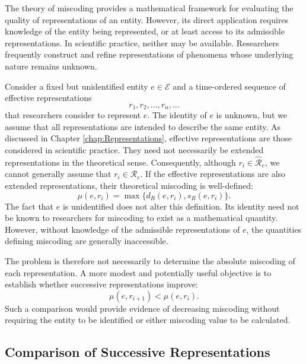 The theory of miscoding provides a mathematical framework for evaluating the quality of representations of an entity. However, its direct application requires knowledge of the entity being represented, or at least access to its admissible representations. In scientific practice, neither may be available. Researchers frequently construct and refine representations of phenomena whose underlying nature remains unknown.

Consider a fixed but unidentified entity $e\in\mathcal E$ and a time-ordered sequence of effective representations
\[
r_1,r_2,\ldots,r_n,\ldots
\]
that researchers consider to represent $e$. The identity of $e$ is unknown, but we assume that all representations are intended to describe the same entity. As discussed in Chapter \ref{chap:Representations}, effective representations are those considered in scientific practice. They need not necessarily be extended representations in the theoretical sense. Consequently, although $r_i\in\hat{\mathcal R}_e$, we cannot generally assume that $r_i\in\mathcal R_e$. If the effective representations are also extended representations, their theoretical miscoding is well-defined:
\[
\mu(e,r_i)
=
\max\{d_R(e,r_i),s_R(e,r_i)\}.
\]
The fact that $e$ is unidentified does not alter this definition. Its identity need not be known to researchers for miscoding to exist as a mathematical quantity. However, without knowledge of the admissible representations of $e$, the quantities defining miscoding are generally inaccessible.

The problem is therefore not necessarily to determine the absolute miscoding of each representation. A more modest and potentially useful objective is to establish whether successive representations improve:
\[
\mu(e,r_{i+1})<\mu(e,r_i).
\]
Such a comparison would provide evidence of decreasing miscoding without requiring the entity to be identified or either miscoding value to be calculated.


\subsection*{Comparison of Successive Representations}

